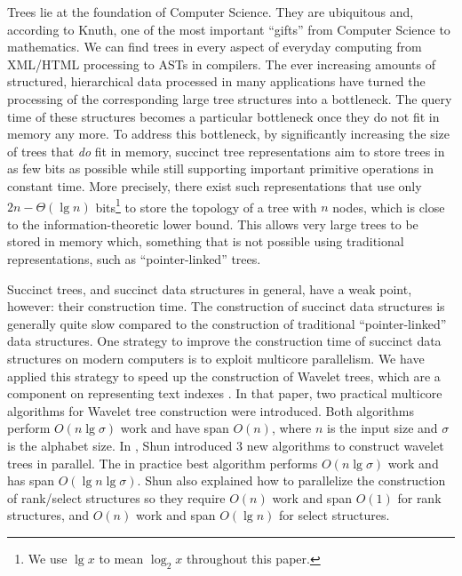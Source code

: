 Trees lie at the foundation of Computer Science. They are ubiquitous and,
according to Knuth, one of the most important ``gifts'' from Computer Science to
mathematics. We can find trees in every
aspect of everyday computing from XML/HTML processing to ASTs in compilers.
The ever increasing amounts of structured, hierarchical data processed in
many applications have turned the processing of the corresponding large tree
structures into a bottleneck.
The query time of these structures becomes a particular bottleneck once they
do not fit in memory any more.
To address this bottleneck, by significantly increasing the size of trees
that \emph{do} fit in memory, succinct tree representations aim to store trees
in as few bits as possible while still supporting important primitive operations
in constant time.
More precisely, there exist such representations that use only
$2n - \Theta(\lg n)$ bits\footnote{We use $\lg x$ to mean
  $\log_{2}x$ throughout this paper.} to store the topology of a tree with $n$
nodes, which is close to the information-theoretic lower bound.
This allows very large trees to be stored in memory which, something that is not
possible using traditional representations, such as ``pointer-linked'' trees.

Succinct trees, and succinct data structures in general, have a weak point,
however: their construction time. The construction of succinct
data structures is generally quite slow compared to the construction of
traditional ``pointer-linked'' data structures.
One strategy to improve the construction time of succinct data structures
on modern computers is to exploit multicore parallelism.
We have applied this strategy to speed up the construction of Wavelet trees,
which are a component on representing text indexes \cite{Fuentes2014}.
In that paper, two practical multicore algorithms
for Wavelet tree construction were introduced. Both algorithms perform
$O(n\lg \sigma)$ work and have span $O(n)$, where $n$
is the input size and $\sigma$ is the alphabet size. In
\cite{DBLP:journals/corr/Shun14}, Shun introduced 3 new algorithms to
construct wavelet trees in parallel. The in practice best algorithm
performs $O(n\lg \sigma)$ work and has span $O(\lg n\lg \sigma)$.
Shun also explained how to parallelize the construction of
rank/select structures so they require $O(n)$ work and span $O(1)$ for rank
structures, and $O(n)$ work and span $O(\lg n)$ for select structures.

